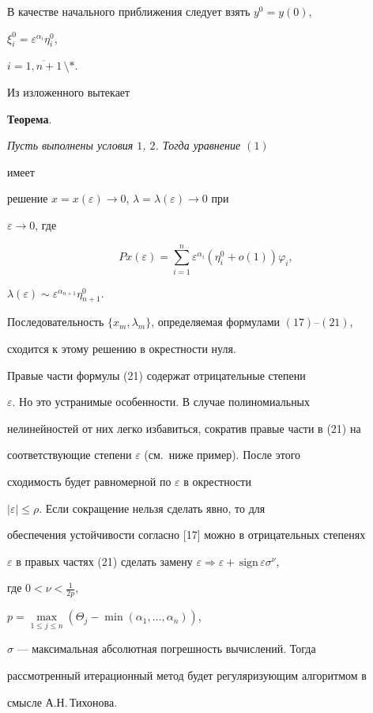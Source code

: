 В качестве начального приближения следует взять $y^0 = y(0)$,


$\xi_i^0 = \varepsilon ^{\alpha_i}\eta_i^0$,


$i = \overline{1,n+1}\,\setminus *$.





Из изложенного вытекает


\medskip





{\bf Теорема}. {\it Пусть выполнены условия $1$, $2$. Тогда уравнение $(1)$


имеет


решение $x=x(\varepsilon)\to 0$, $\lambda=\lambda(\varepsilon)\to 0$ при


$\varepsilon \to 0$, где


$$


P x(\varepsilon) = \sum^n_{i=1}\varepsilon ^{\alpha_i}(\eta_i^0 +


o(1))\varphi_i,


$$


$\lambda(\varepsilon)\sim \varepsilon^{\alpha_{n+1}}\eta^0_{n+1}. $


Последовательность $\{x_m,\lambda_m\}$, определяемая формулами $(17)$--$(21)$,


сходится к этому решению в окрестности нуля.}





\begin{note}


Правые части формулы (21) содержат отрицательные степени


$\varepsilon$. Но это устранимые особенности. В случае полиномиальных


нелинейностей от них легко избавиться, сократив правые части в (21) на


соответствующие степени $\varepsilon$ (см.\ ниже пример). После этого


сходимость будет равномерной по $\varepsilon$ в окрестности


$|\varepsilon|\le\rho$. Если сокращение нельзя сделать явно, то для


обеспечения устойчивости согласно [17] можно в отрицательных степенях


$\varepsilon$ в правых частях (21) сделать замену $\varepsilon \Rightarrow


\varepsilon +\, \text{sign}\, \varepsilon\sigma^{\nu}$,


где $0<\nu<\frac{1}{2p}$, 


$p = \max\limits_{1\le j\le n}(\Theta_j - \min(\alpha_1,\dotsc,\alpha_n))$,


$\sigma$ --- максимальная абсолютная погрешность вычислений. Тогда


рассмотренный итерационный метод будет регуляризующим алгоритмом в


смысле А.Н.\,Тихонова.


\end{note}





